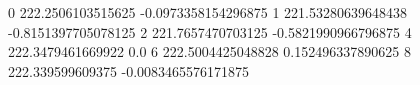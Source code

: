 0 222.2506103515625 -0.0973358154296875
1 221.53280639648438 -0.8151397705078125
2 221.7657470703125 -0.5821990966796875
4 222.3479461669922 0.0
6 222.5004425048828 0.152496337890625
8 222.339599609375 -0.0083465576171875
